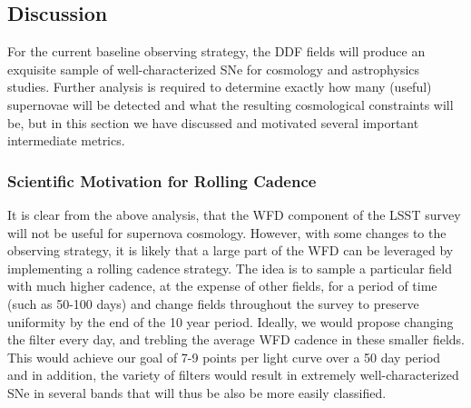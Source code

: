 
% 
% 
% 




\subsection{Discussion}
For the current baseline observing strategy, the DDF fields will produce an exquisite sample of 
well-characterized SNe for cosmology and astrophysics studies. Further analysis is required to 
determine exactly how many (useful) supernovae will be detected and what the resulting cosmological 
constraints will be, but in this section we have discussed and motivated several important 
intermediate metrics.

\subsubsection{Scientific Motivation for Rolling Cadence}
It is clear from the above analysis, that the WFD component of the LSST survey will not be useful 
for supernova cosmology. However, with some changes to the observing strategy, it is likely that a 
large part of the WFD can be leveraged by implementing a rolling cadence strategy. The idea is to 
sample a particular field with much higher cadence, at the expense of other fields, for a period of 
time (such as 50-100 days) and change fields throughout the survey to preserve uniformity by the end 
of the 10 year period. Ideally, we would propose changing the filter every day, and trebling the 
average WFD cadence in these smaller fields. This would achieve our goal of 7-9 points per light 
curve over a 50 day period and in addition, the variety of filters would result in extremely 
well-characterized SNe in several bands that will thus be also be more easily classified.  

